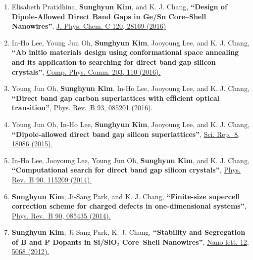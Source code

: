 \begin{enumerate}
{  Asia Materials 9, e400 (2017)}
\item
  Elisabeth Pratidhina, \textbf{Sunghyun Kim}, and K. J. Chang,
  \textbf{``Design of Dipole-Allowed Direct Band Gaps in Ge/Sn
  Core--Shell Nanowires''},
  \href{http://pubs.acs.org/doi/abs/10.1021/acs.jpcc.6b08779}{J. Phys.
  Chem. C 120, 28169 (2016)}
\item
  In-Ho Lee, Young Jun Oh, \textbf{Sunghyun Kim}, Jooyoung Lee, and K.
  J. Chang, \textbf{``Ab initio materials design using conformational
  space annealing and its application to searching for direct band gap
  silicon crystals''},
  \href{http://dx.doi.org/10.1016/j.cpc.2016.02.011}{Comp. Phys. Comm.
  203, 110 (2016).}
\item
  Young Jun Oh, \textbf{Sunghyun Kim}, In-Ho Lee, Jooyoung Lee, and K.
  J. Chang, \textbf{``Direct band gap carbon superlattices with
  efficient optical transition''},
  \href{http://journals.aps.org/prb/abstract/10.1103/PhysRevB.93.085201}{Phys.
  Rev.~B 93, 085201 (2016).}
\item
  Young Jun Oh, In-Ho Lee, \textbf{Sunghyun Kim}, Jooyoung Lee, and K.
  J. Chang, \textbf{``Dipole-allowed direct band gap silicon
  superlattices''}, \href{http://dx.doi.org/10.1038/srep18086}{Sci.
  Rep.~8, 18086 (2015).}
\item
  In-Ho Lee, Jooyoung Lee, Young Jun Oh, \textbf{Sunghyun Kim}, and K.
  J. Chang, \textbf{``Computational search for direct band gap silicon
  crystals''},
  \href{http://journals.aps.org/prb/abstract/10.1103/PhysRevB.90.115209}{Phys.
  Rev.~B 90, 115209 (2014).}
\item
  \textbf{Sunghyun Kim}, Ji-Sang Park, and K. J. Chang,
  \textbf{``Finite-size supercell correction scheme for charged defects
  in one-dimensional systems''},
  \href{http://journals.aps.org/prb/abstract/10.1103/PhysRevB.90.085435}{Phys.
  Rev.~B 90, 085435 (2014).}
\item
  \textbf{Sunghyun Kim}, Ji-Sang Park, K. J. Chang, \textbf{``Stability
  and Segregation of B and P Dopants in Si/SiO\(_2\) Core--Shell
  Nanowires''},
  \href{http://pubs.acs.org/doi/abs/10.1021/nl3013924}{Nano lett. 12,
  5068 (2012).}
\end{enumerate}
